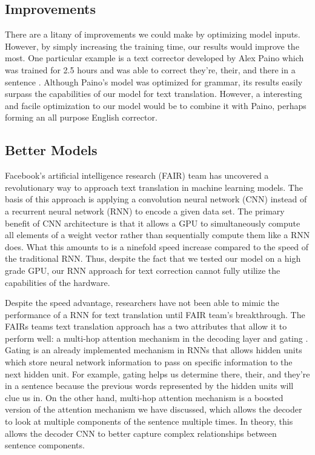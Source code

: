 \documentclass[11pt,a4paper]{scrartcl}
\theoremstyle{definition}
\begin{document}
\subsection{Improvements}
There are a litany of improvements we could make by optimizing model inputs. However, by simply increasing the training time, our results would improve the most. One particular example is a text corrector developed by Alex Paino which was trained for 2.5 hours and was able to correct they're, their, and there in a sentence \cite{Floyd}. Although Paino's model was optimized for grammar, its results easily surpass the capabilities of our model for text translation. However, a interesting and facile optimization to our model would be to combine it with Paino, perhaps forming an all purpose English corrector.
\subsection{Better Models}
Facebook’s artificial intelligence research (FAIR) team has uncovered a revolutionary way to approach text translation in machine learning models. The basis of this approach is applying a convolution neural network (CNN) instead of a recurrent neural network (RNN) to encode a given data set. The primary benefit of CNN architecture is that it allows a GPU to simultaneously compute all elements of a weight vector rather than sequentially compute them like a RNN does. What this amounts to is a ninefold speed increase compared to the speed of the traditional RNN. Thus, despite the fact that we tested our model on a high grade GPU, our RNN approach for text correction cannot fully utilize the capabilities of the hardware. \newline

Despite the speed advantage, researchers have not been able to mimic the performance of a RNN for text translation until FAIR team’s breakthrough. The FAIRs teams text translation approach has a two attributes that allow it to perform well: a multi-hop attention mechanism in the decoding layer and gating \cite{Gehring}. Gating is an already implemented mechanism in RNNs that allows hidden units which store neural network information to pass on specific information to the next hidden unit. For example, gating helps us determine there, their, and they’re in a sentence because the previous words represented by the hidden units will clue us in. On the other hand, multi-hop attention mechanism is a boosted version of the attention mechanism we have discussed, which allows the decoder to look at multiple components of the sentence multiple times. In theory, this allows the decoder CNN to better capture complex relationships between sentence components.
\end{document}
